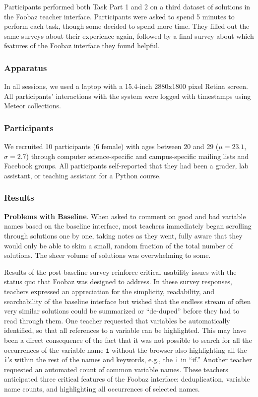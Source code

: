Participants performed both Task Part 1 and 2 on a third dataset of solutions in the Foobaz teacher interface. Participants were asked to spend 5 minutes to perform each task, though some decided to spend more time. They filled out the same surveys about their experience again, followed by a final survey about which features of the Foobaz interface they found helpful. 

\subsubsection{Apparatus}

In all sessions, we used a laptop with a 15.4-inch 2880x1800 pixel Retina screen. All participants' interactions with the system were logged with timestamps using Meteor collections.

\subsubsection{Participants}

We recruited 10 participants (6 female) with ages between 20 and 29 ($\mu=23.1$, $\sigma=2.7$) through computer science-specific and campus-specific mailing lists and Facebook groups. All participants self-reported that they had been a grader, lab assistant, or teaching assistant for a Python course. 

\subsubsection{Results}

\textbf{Problems with Baseline}. When asked to comment on good and bad variable names based on the baseline interface, most teachers immediately began scrolling through solutions one by one, taking notes as they went, fully aware that they would only be able to skim a small, random fraction of the total number of solutions. The sheer volume of solutions was overwhelming to some. 

Results of the post-baseline survey reinforce critical usability issues with the status quo that Foobaz was designed to address. In these survey responses, teachers expressed an appreciation for the simplicity, readability, and searchability of the baseline interface but wished that the endless stream of often very similar solutions could be summarized or ``de-duped'' before they had to read through them. One teacher requested that variables be automatically identified, so that all references to a variable can be highlighted. This may have been a direct consequence of the fact that it was not possible to search for all the occurrences of the variable name \texttt{i} without the browser also highlighting all the \texttt{i}'s within the rest of the names and keywords, e.g., the \texttt{i} in ``if.'' Another teacher requested an automated count of common variable names. These teachers anticipated three critical features of the Foobaz interface: deduplication, variable name counts, and highlighting all occurrences of selected names.

